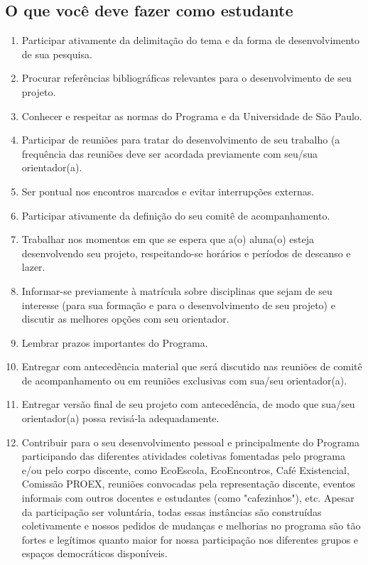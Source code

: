 \documentclass[twoside a4paper 12pt]{report}
\begin{document}
\subsection{O que você deve fazer como estudante}
\begin{enumerate}
\item Participar ativamente da delimitação do tema e da forma de desenvolvimento de sua pesquisa.
\item Procurar referências bibliográficas relevantes para o desenvolvimento de seu projeto.
\item Conhecer e respeitar as normas do Programa e da Universidade de São Paulo.
\item Participar de reuniões para tratar do desenvolvimento de seu trabalho (a frequência das reuniões deve ser acordada previamente com seu/sua orientador(a).
\item Ser pontual nos encontros marcados e evitar interrupções externas.
\item Participar ativamente da definição do seu comitê de acompanhamento.
\item Trabalhar nos momentos em que se espera que a(o) aluna(o) esteja desenvolvendo seu projeto, respeitando-se horários e períodos de descanso e lazer.
\item Informar-se previamente à matrícula sobre disciplinas que sejam de seu interesse (para sua formação e para o desenvolvimento de seu projeto) e discutir as melhores opções com seu orientador.
\item Lembrar prazos importantes do Programa.
\item Entregar com antecedência material que será discutido nas reuniões de comitê de acompanhamento ou em reuniões exclusivas com sua/seu orientador(a).
\item Entregar versão final de seu projeto com antecedência, de modo que sua/seu orientador(a) possa revisá-la adequadamente.
\item Contribuir para o seu desenvolvimento pessoal e principalmente do Programa participando das diferentes atividades coletivas fomentadas pelo programa e/ou pelo corpo discente, como EcoEscola, EcoEncontros, Café Existencial, Comissão PROEX, reuniões convocadas pela representação discente, eventos informais com outros docentes e estudantes (como "cafezinhos"), etc. Apesar da participação ser voluntária, todas essas instâncias são construídas coletivamente e nossos pedidos de mudanças e melhorias no programa são tão fortes e legítimos quanto maior for nossa participação nos diferentes grupos e espaços democráticos disponíveis. 
\end{enumerate}
\end{document}
